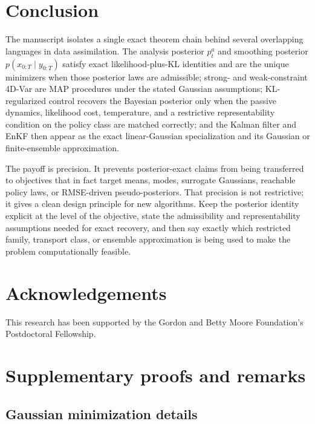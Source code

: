 \documentclass[11pt]{article}
\newcommand{\xtraj}{x_{0:T}}
\newcommand{\ytraj}{y_{0:T}}
\numberwithin{equation}{section}
\theoremstyle{plain}
\theoremstyle{definition}
\theoremstyle{remark}
\begin{document}
% 
\section{Conclusion}
\label{sec:conclusion}

The manuscript isolates a single exact theorem chain behind several overlapping languages in data assimilation. The analysis posterior $p_t^a$ and smoothing posterior $p(\xtraj\mid \ytraj)$ satisfy exact likelihood-plus-KL identities and are the unique minimizers when those posterior laws are admissible; strong- and weak-constraint 4D-Var are MAP procedures under the stated Gaussian assumptions; KL-regularized control recovers the Bayesian posterior only when the passive dynamics, likelihood cost, temperature, and a restrictive representability condition on the policy class are matched correctly; and the Kalman filter and EnKF then appear as the exact linear-Gaussian specialization and its Gaussian or finite-ensemble approximation.

The payoff is precision. It prevents posterior-exact claims from being transferred to objectives that in fact target means, modes, surrogate Gaussians, reachable policy laws, or RMSE-driven pseudo-posteriors. That precision is not restrictive; it gives a clean design principle for new algorithms. Keep the posterior identity explicit at the level of the objective, state the admissibility and representability assumptions needed for exact recovery, and then say exactly which restricted family, transport class, or ensemble approximation is being used to make the problem computationally feasible.


\section*{Acknowledgements}
This research has been supported by the Gordon and Betty Moore Foundation’s Postdoctoral Fellowship. 

\appendix
\section{Supplementary proofs and remarks}

\subsection{Gaussian minimization details}
\label{app:gaussian-minimization}
\end{document}
